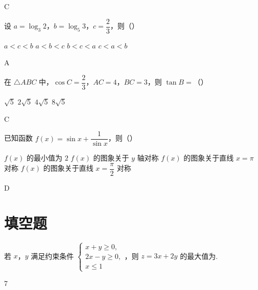 \begin{answer}
C
\end{answer}



\begin{problem}
设 \(a=\log_3 2\)，\(b=\log_5 3\)，\(c=\dfrac{2}{3}\)，则（\quad）

\choices
    {\(a<c<b\)}
    {\(a<b<c\)}
    {\(b<c<a\)}
    {\(c<a<b\)}
\end{problem}

\begin{answer}
A
\end{answer}



\begin{problem}
在 \(\triangle ABC\) 中，\(\cos C=\dfrac{2}{3}\)，\(AC=4\)，\(BC=3\)，则 \(\tan B=\)（\quad）

\choices
    {\(\sqrt5\)}
    {\(2\sqrt5\)}
    {\(4\sqrt5\)}
    {\(8\sqrt5\)}
\end{problem}

\begin{answer}
C
\end{answer}



\begin{problem}
已知函数 \(f(x)=\sin x+\dfrac{1}{\sin x}\)，则（\quad）

\choices
    {\(f(x)\) 的最小值为 \(2\)}
    {\(f(x)\) 的图象关于 \(y\) 轴对称}
    {\(f(x)\) 的图象关于直线 \(x=\pi\) 对称}
    {\(f(x)\) 的图象关于直线 \(x=\dfrac{\pi}{2}\) 对称}
\end{problem}

\begin{answer}
D
\end{answer}


\section{填空题}

\begin{problem}
若 \(x\)，\(y\) 满足约束条件
\(\begin{cases}
x+y\ge 0,\\
2x-y\ge 0,\\
x\le 1
\end{cases}\)，则 \(z=3x+2y\) 的最大值为\fillinblank{}.
\end{problem}

\begin{answer}
7
\end{answer}


